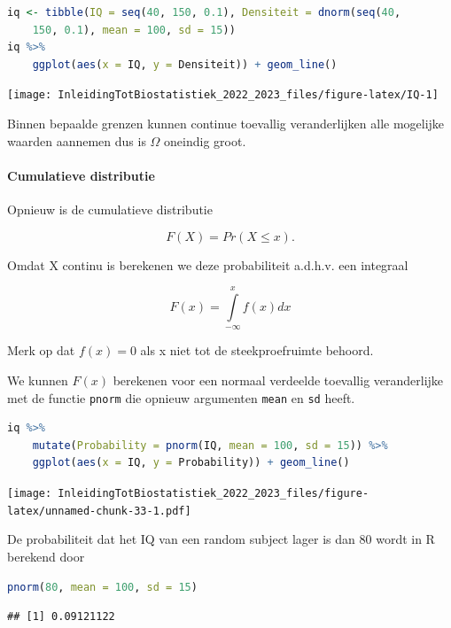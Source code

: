 \documentclass[
  12pt,dutch,coursenotes]{book}
\newcommand{\passthrough}[1]{#1}
\begin{document}
\begin{lstlisting}[language=R]
iq <- tibble(IQ = seq(40, 150, 0.1), Densiteit = dnorm(seq(40,
    150, 0.1), mean = 100, sd = 15))
iq %>%
    ggplot(aes(x = IQ, y = Densiteit)) + geom_line()
\end{lstlisting}

\begin{center}\texttt{[image: InleidingTotBiostatistiek\_2022\_2023\_files/figure-latex/IQ-1]} \end{center}

Binnen bepaalde grenzen kunnen continue toevallig veranderlijken alle mogelijke waarden aannemen dus is \(\Omega\) oneindig groot.

\hypertarget{cumulatieve-distributie}{%
\paragraph{Cumulatieve distributie}\label{cumulatieve-distributie}}

Opnieuw is de cumulatieve distributie

\[F(X)=Pr(X\leq x).\]

Omdat X continu is berekenen we deze probabiliteit a.d.h.v. een integraal

\[F(x)=\int \limits_{-\infty}^x f(x) dx\]

Merk op dat \(f(x)=0\) als x niet tot de steekproefruimte behoord.

We kunnen \(F(x)\) berekenen voor een normaal verdeelde toevallig veranderlijke met de functie \passthrough{\lstinline!pnorm!} die opnieuw argumenten \passthrough{\lstinline!mean!} en \passthrough{\lstinline!sd!} heeft.

\begin{lstlisting}[language=R]
iq %>%
    mutate(Probability = pnorm(IQ, mean = 100, sd = 15)) %>%
    ggplot(aes(x = IQ, y = Probability)) + geom_line()
\end{lstlisting}

\texttt{[image: InleidingTotBiostatistiek\_2022\_2023\_files/figure-latex/unnamed-chunk-33-1.pdf]}

De probabiliteit dat het IQ van een random subject lager is dan 80 wordt in R berekend door

\begin{lstlisting}[language=R]
pnorm(80, mean = 100, sd = 15)
\end{lstlisting}

\begin{lstlisting}
## [1] 0.09121122
\end{lstlisting}
\end{document}
